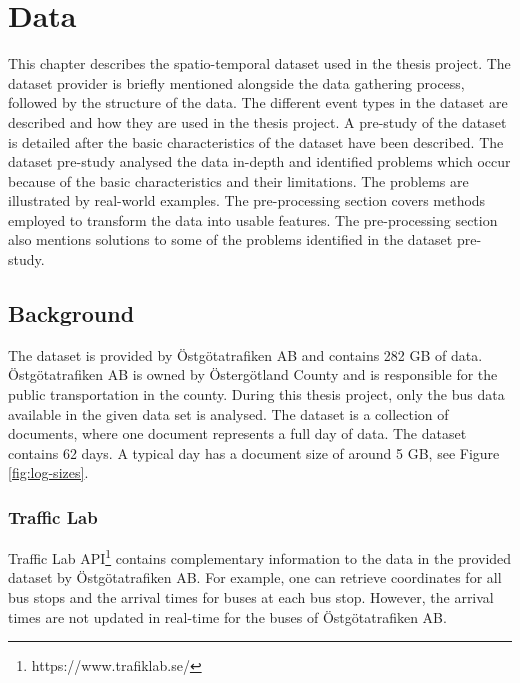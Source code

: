 \chapter{Data}
\label{cha:data}

This chapter describes the spatio-temporal dataset used in the thesis project.
The dataset provider is briefly mentioned alongside the data gathering process, followed by the structure of the data.
The different event types in the dataset are described and how they are used in the thesis project.
A pre-study of the dataset is detailed after the basic characteristics of the dataset have been described.
The dataset pre-study analysed the data in-depth and identified problems which occur because of the basic characteristics and their limitations.
The problems are illustrated by real-world examples.
The pre-processing section covers methods employed to transform the data into usable features.
The pre-processing section also mentions solutions to some of the problems identified in the dataset pre-study.

\section{Background}
The dataset is provided by Östgötatrafiken AB and contains 282 GB of data.
Östgötatrafiken AB is owned by Östergötland County and is responsible for the public transportation in the county.
During this thesis project, only the bus data available in the given data set is analysed.
The dataset is a collection of documents, where one document represents a full day of data.
The dataset contains 62 days.
A typical day has a document size of around 5 GB, see Figure \ref{fig:log-sizes}.

\subsection{Traffic Lab}
Traffic Lab API\footnote{https://www.trafiklab.se/} contains complementary information to the data in the provided dataset by Östgötatrafiken AB.
For example, one can retrieve coordinates for all bus stops and the arrival times for buses at each bus stop.
However, the arrival times are not updated in real-time for the buses of Östgötatrafiken AB.

